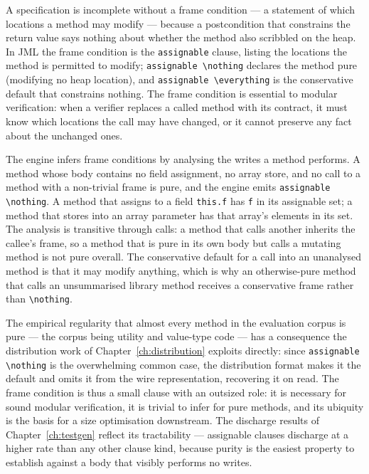 A specification is incomplete without a frame condition --- a statement of which
locations a method may modify --- because a postcondition that constrains the
return value says nothing about whether the method also scribbled on the heap. In
JML the frame condition is the \texttt{assignable} clause, listing the locations
the method is permitted to modify; \texttt{assignable \textbackslash nothing}
declares the method pure (modifying no heap location), and \texttt{assignable
\textbackslash everything} is the conservative default that constrains nothing.
The frame condition is essential to modular verification: when a verifier
replaces a called method with its contract, it must know which locations the call
may have changed, or it cannot preserve any fact about the unchanged ones.

The engine infers frame conditions by analysing the writes a method performs. A
method whose body contains no field assignment, no array store, and no call to a
method with a non-trivial frame is pure, and the engine emits \texttt{assignable
\textbackslash nothing}. A method that assigns to a field \texttt{this.f} has
\texttt{f} in its assignable set; a method that stores into an array parameter has
that array's elements in its set. The analysis is transitive through calls: a
method that calls another inherits the callee's frame, so a method that is pure
in its own body but calls a mutating method is not pure overall. The conservative
default for a call into an unanalysed method is that it may modify anything, which
is why an otherwise-pure method that calls an unsummarised library method receives
a conservative frame rather than \texttt{\textbackslash nothing}.

The empirical regularity that almost every method in the evaluation corpus is
pure --- the corpus being utility and value-type code --- has a consequence the
distribution work of Chapter~\ref{ch:distribution} exploits directly: since
\texttt{assignable \textbackslash nothing} is the overwhelming common case, the
distribution format makes it the default and omits it from the wire
representation, recovering it on read. The frame condition is thus a small clause
with an outsized role: it is necessary for sound modular verification, it is
trivial to infer for pure methods, and its ubiquity is the basis for a size
optimisation downstream. The discharge results of Chapter~\ref{ch:testgen}
reflect its tractability --- assignable clauses discharge at a higher rate than
any other clause kind, because purity is the easiest property to establish
against a body that visibly performs no writes.

